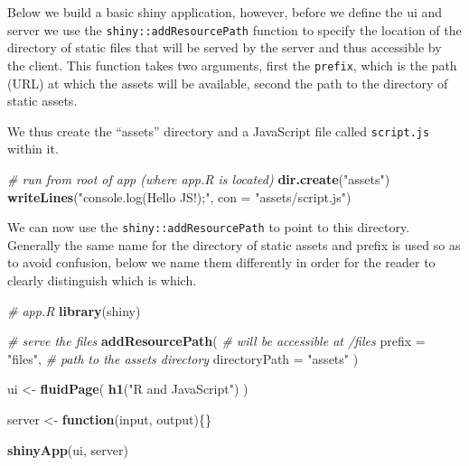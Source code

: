 \documentclass[
]{krantz}
\makeatletter
\newenvironment{Shaded}{\begin{snugshade}}{\end{snugshade}}
\newcommand{\CommentTok}[1]{\textcolor[rgb]{0.37,0.37,0.37}{\textit{#1}}}
\newcommand{\ControlFlowTok}[1]{\textcolor[rgb]{0.27,0.27,0.27}{\textbf{#1}}}
\newcommand{\DataTypeTok}[1]{\textcolor[rgb]{0.27,0.27,0.27}{#1}}
\newcommand{\KeywordTok}[1]{\textcolor[rgb]{0.27,0.27,0.27}{\textbf{#1}}}
\newcommand{\NormalTok}[1]{#1}
\newcommand{\StringTok}[1]{\textcolor[rgb]{0.5,0.5,0.5}{#1}}
\newenvironment{kframe}{%
\medskip{}
\setlength{\fboxsep}{.8em}
 \def\at@end@of@kframe{}%
 \ifinner\ifhmode%
  \def\at@end@of@kframe{\end{minipage}}%
  \begin{minipage}{\columnwidth}%
 \fi\fi%
 \def\FrameCommand##1{\hskip\@totalleftmargin \hskip-\fboxsep
 \colorbox{shadecolor}{##1}\hskip-\fboxsep
     \hskip-\linewidth \hskip-\@totalleftmargin \hskip\columnwidth}%
 \MakeFramed {\advance\hsize-\width
   \@totalleftmargin\z@ \linewidth\hsize
   \@setminipage}}%
 {\par\unskip\endMakeFramed%
 \at@end@of@kframe}
\renewenvironment{Shaded}{\begin{kframe}}{\end{kframe}}
\makeatother
\begin{document}
Below we build a basic shiny application, however, before we define the ui and server we use the \texttt{shiny::addResourcePath} function to specify the location of the directory of static files that will be served by the server and thus accessible by the client. This function takes two arguments, first the \texttt{prefix}, which is the path (URL) at which the assets will be available, second the path to the directory of static assets.

We thus create the ``assets'' directory and a JavaScript file called \texttt{script.js} within it.

\begin{Shaded}
\begin{Highlighting}[]
\CommentTok{\# run from root of app (where app.R is located)}
\KeywordTok{dir.create}\NormalTok{(}\StringTok{"assets"}\NormalTok{)}
\KeywordTok{writeLines}\NormalTok{(}\StringTok{"console.log(\textquotesingle{}Hello JS!\textquotesingle{});"}\NormalTok{, }\DataTypeTok{con =} \StringTok{"assets/script.js"}\NormalTok{)}
\end{Highlighting}
\end{Shaded}

We can now use the \texttt{shiny::addResourcePath} to point to this directory. Generally the same name for the directory of static assets and prefix is used so as to avoid confusion, below we name them differently in order for the reader to clearly distinguish which is which.

\begin{Shaded}
\begin{Highlighting}[]
\CommentTok{\# app.R}
\KeywordTok{library}\NormalTok{(shiny)}

\CommentTok{\# serve the files}
\KeywordTok{addResourcePath}\NormalTok{(}
  \CommentTok{\# will be accessible at /files}
  \DataTypeTok{prefix =} \StringTok{"files"}\NormalTok{, }
  \CommentTok{\# path to the assets directory}
  \DataTypeTok{directoryPath =} \StringTok{"assets"}
\NormalTok{)}

\NormalTok{ui \textless{}{-}}\StringTok{ }\KeywordTok{fluidPage}\NormalTok{(}
  \KeywordTok{h1}\NormalTok{(}\StringTok{"R and JavaScript"}\NormalTok{)}
\NormalTok{)}

\NormalTok{server \textless{}{-}}\StringTok{ }\ControlFlowTok{function}\NormalTok{(input, output)\{\}}

\KeywordTok{shinyApp}\NormalTok{(ui, server)}
\end{Highlighting}
\end{Shaded}
\end{document}
